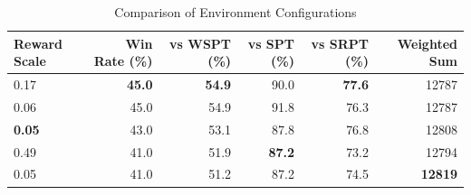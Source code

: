 \begin{table}[htbp]%
\centering%
\begin{tabular}{lrrrrr}%
\toprule%
\textbf{Reward Scale}&\textbf{Win Rate (\%)}&\textbf{vs WSPT (\%)}&\textbf{vs SPT (\%)}&\textbf{vs SRPT (\%)}&\textbf{Weighted Sum}\\%
\midrule%
0.17&\textbf{45.0}&\textbf{54.9}&90.0&\textbf{77.6}&12787\\%
0.06&45.0&54.9&91.8&76.3&12787\\%
\textbf{0.05}&43.0&53.1&87.8&76.8&12808\\%
0.49&41.0&51.9&\textbf{87.2}&73.2&12794\\%
0.05&41.0&51.2&87.2&74.5&\textbf{12819}\\%
\bottomrule%
\end{tabular}%
\caption{Comparison of Environment Configurations}%
\label{tab:environment}%
\end{table}